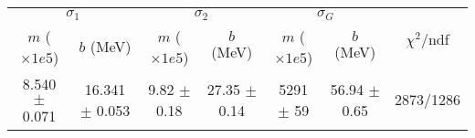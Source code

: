 \begin{tabular}{cc|cc|cc||c}
\multicolumn{2}{c|}{$\sigma_1$} & \multicolumn{2}{|c}{$\sigma_2$} & \multicolumn{2}{|c}{$\sigma_G$}  & \multirow{2}{*}{$\chi^2/$ndf}\\
$m$ ($\times1e5$) & $b$ (MeV) & $m$ ($\times1e5$) & $b$ (MeV) & $m$ ($\times1e5$) & $b$ (MeV) & \\
\hline
8.540 $\pm$ 0.071 & 16.341 $\pm$ 0.053 & 9.82 $\pm$ 0.18 & 27.35 $\pm$ 0.14 & 5291 $\pm$ 59 & 56.94 $\pm$ 0.65 & 2873/1286\\
\end{tabular}
